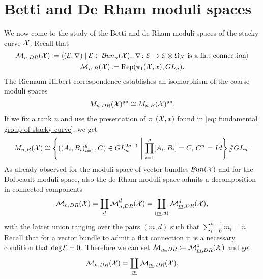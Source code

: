 \section{Betti and De Rham moduli spaces}\label{section: de rham moduli space}

We now come to the study of the Betti and de Rham moduli spaces of the stacky curve $\mathcal{X}$.
Recall that
\begin{gather}
\mathcal{M}_{n, DR}(\mathcal{X}) \coloneqq \left< (\mathcal{E}, \nabla) \;\middle|\; \mathcal{E}\in \mathcal{B}\kern -.5pt un_n(\mathcal{X}), \; \nabla\colon \mathcal{E} \to \mathcal{E}\otimes \Omega_{X} \text{ is a flat connection} \right> \\
\mathcal{M}_{n, B}(\mathcal{X}) \coloneqq \text{Rep}(\pi_1(\mathcal{X}, x), GL_n).
\end{gather}
The Riemann-Hilbert correspondence establishes an isomorphism
of the coarse moduli spaces
\begin{equation} \label{eq: riemann holbert correspondence}
M_{n, DR}(\mathcal{X})^{\text{an}} \cong M_{n, B}(\mathcal{X})^{\text{an}}.
\end{equation}
If we fix a rank $n$ and use the presentation of $\pi_1(\mathcal{X}, x)$ found in \eqref{eq: fundamental group of stacky curve}, we get
\begin{equation} \label{eq: de rham moduli space rnk n}
M_{n, B}(\mathcal{X}) \cong \left\{ ((A_i, B_i)_{i = 1}^g, C) \in GL_n^{2g +1} \;\middle|\; \prod_{i=1}^{g}[A_i, B_i] = C, \, C^n = Id \right\} /\!\!/ GL_n.
\end{equation}
As already observed for the moduli space of vector bundles $\mathcal{B}\kern -.5pt un(\mathcal{X})$ and for the Dolbeault moduli space, also the de Rham moduli space admits a decomposition in connected components
\begin{equation}
\mathcal{M}_{n, DR}(\mathcal{X}) = \coprod_{\underline{d}} \mathcal{M}_{n, DR}^{\underline{d}}(\mathcal{X}) = \coprod_{(\underline{m}, d)} \mathcal{M}_{\underline{m}, DR}^d(\mathcal{X}),
\end{equation}
with the latter union ranging over the pairs $(\underline{m}, d)$ such that $\sum_{i=0}^{n-1}m_{i} = n$. 
Recall that for a vector bundle to admit a flat connection it is a necessary condition that $\deg \mathcal{E} = 0$. Therefore we can set $\mathcal{M}_{\underline{m}, DR} \coloneqq \mathcal{M}_{\underline{m}, DR}^0(\mathcal{X})$ and get
\begin{equation}
\mathcal{M}_{n, DR}(\mathcal{X}) = \coprod_{\underline{m}} \mathcal{M}_{\underline{m}, DR}(\mathcal{X}).
\end{equation}

